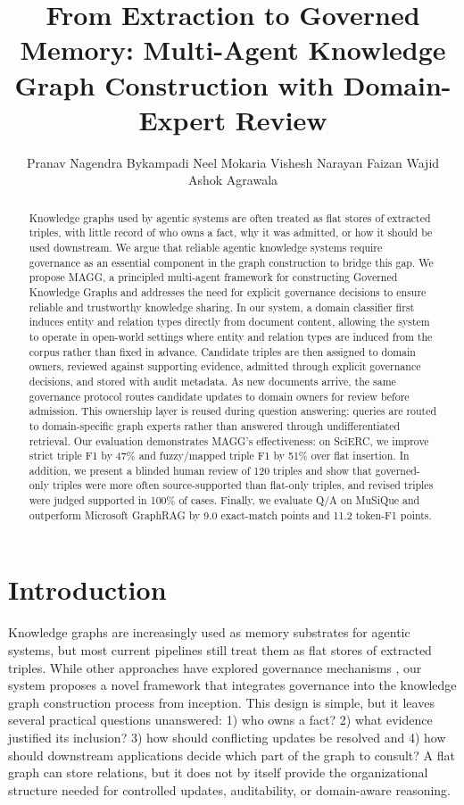 \documentclass{article}
\title{From Extraction to Governed Memory: Multi-Agent Knowledge Graph Construction with Domain-Expert Review}
\author{
  Pranav Nagendra Bykampadi
  \And
  Neel Mokaria
  \And
  Vishesh Narayan
  \And
  Faizan Wajid
  \And 
  Ashok Agrawala
}
\newcommand{\system}{\textsc{MAGG}}
\begin{document}
\maketitle

\begin{abstract}
Knowledge graphs used by agentic systems are often treated as flat stores of extracted triples, with little record of who owns a fact, why it was admitted, or how it should be used downstream. We argue that reliable agentic knowledge systems require governance as an essential component in the graph construction to bridge this gap. We propose \system{}, a principled multi-agent framework for constructing Governed Knowledge Graphs and addresses the need for explicit governance decisions to ensure reliable and trustworthy knowledge sharing. In our system, a domain classifier first induces entity and relation types directly from document content, allowing the system to operate in open-world settings where entity and relation types are induced from the corpus rather than fixed in advance. Candidate triples are then assigned to domain owners, reviewed against supporting evidence, admitted through explicit governance decisions, and stored with audit metadata. As new documents arrive, the same governance protocol routes candidate updates to domain owners for review before admission. This ownership layer is reused during question answering: queries are routed to domain-specific graph experts rather than answered through undifferentiated retrieval. Our evaluation demonstrates \system{}'s effectiveness: on SciERC, we improve strict triple F1 by 47\% and fuzzy/mapped triple F1 by 51\% over flat insertion. In addition, we present a blinded human review of 120 triples and show that governed-only triples were more often source-supported than flat-only triples, and revised triples were judged supported in 100\% of cases. Finally, we evaluate Q/A on MuSiQue and outperform Microsoft GraphRAG by 9.0 exact-match points and 11.2 token-F1 points.
\end{abstract}

\section{Introduction}

Knowledge graphs are increasingly used as memory substrates for agentic systems, but most current pipelines still treat them as flat stores of extracted triples. While other approaches have explored governance mechanisms \citep{lu2025karma, ye2024cooperkgc}, our system proposes a novel framework that integrates governance into the knowledge graph construction process from inception. This design is simple, but it leaves several practical questions unanswered: 1) who owns a fact? 2) what evidence justified its inclusion? 3) how should conflicting updates be resolved and 4) how should downstream applications decide which part of the graph to consult? A flat graph can store relations, but it does not by itself provide the organizational structure needed for controlled updates, auditability, or domain-aware reasoning.
\end{document}
